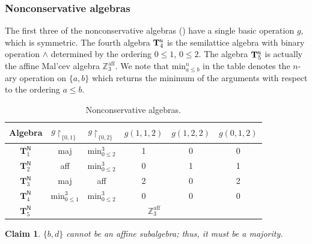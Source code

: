 \documentclass[10pt,a4paper]{amsart}
\newtheorem{claim}{Claim}
\def\T{\mathbf{T}}
\newcommand{\m}[1]{\mathbf{\uppercase{#1}}}
\newcommand{\n}{\scriptscriptstyle{\mathsf{N}}}
\begin{document}
\subsubsection*{Nonconservative algebras}
The first three of the nonconservative algebras () have a single basic operation $g$, which is symmetric. The fourth algebra ${\m T}_4^{\n}$ is the semilattice algebra with binary operation $\wedge$ determined by the ordering $0 \leqslant 1$, $0 \leqslant 2$. The algebra ${\m T}_5^{\n}$ is actually the affine Mal'cev algebra $\mathbb{Z}^{\mathrm{aff}}_3$. We note that $\mathrm{min}^n_{a\leqslant b}$ in the table denotes the $n$-ary operation on $\{a,b\}$ which returns the minimum of the arguments with respect to the ordering $a\leqslant b$.
\begin{table}[h!]
\centering
 \begin{tabular}{|c||c|c|c|c|c|}
\hline
    Algebra & $g{\restriction_{\{0,1\}}}$ & $g{\restriction_{\{0,2\}}}$ & $g(1,1,2)$ & $g(1,2,2)$ & $g(0,1,2)$ \\
\hline\hline
     $\T^{\n}_1$  & maj& $\text{min}^3_{0\leqslant 2}$ & 1 & 0 & 0\\
\hline
    $\T^{\n}_2$  & aff & $\text{min}^3_{0\leqslant 2}$ & 0 & 1 & 1\\
\hline
    $\T^{\n}_3$  & maj & aff & 2 & 0 & 2\\
\hline
    $\T^{\n}_4$  & $\text{min}^3_{0\leqslant 1}$ & $\text{min}^3_{0\leqslant 2}$ & 0 & 0 & 0\\
\hline
    $\T^{\n}_5$  & \multicolumn{5}{|c|}{$\mathbb{Z}^{\mathrm{aff}}_3$}\\
\hline
\end{tabular}  
\caption{Nonconservative algebras.}
\label{table:1}
\end{table}

\begin{claim}
 $\{b,d\}$ cannot be an affine subalgebra; thus, it must be a majority.
\end{claim}
\end{document}
